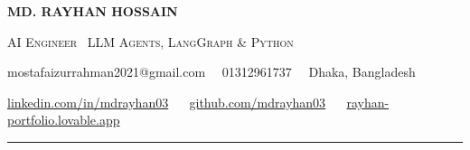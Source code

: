 \documentclass[a4paper,10pt]{article}
\newcommand{\dotsep}{\ \textperiodcentered\ }
\begin{document}
\begin{center}
  {\Huge\bfseries MD. RAYHAN HOSSAIN}\par\vspace{4pt}
  {\large\color{accent}\scshape AI Engineer \textbar\ LLM Agents, LangGraph \& Python}\par\vspace{6pt}
  {\small mostafaizurrahman2021@gmail.com \dotsep 01312961737 \dotsep Dhaka, Bangladesh}\par\vspace{2.5pt}
  {\small \href{https://www.linkedin.com/in/mdrayhan03/}{linkedin.com/in/mdrayhan03} \dotsep
          \href{https://github.com/mdrayhan03}{github.com/mdrayhan03} \dotsep
          \href{https://rayhan-portfolio.lovable.app}{rayhan-portfolio.lovable.app}}
\end{center}
\vspace{4pt}\noindent\textcolor{hairline}{\rule{\textwidth}{1pt}}\par\vspace{2pt}
\end{document}
